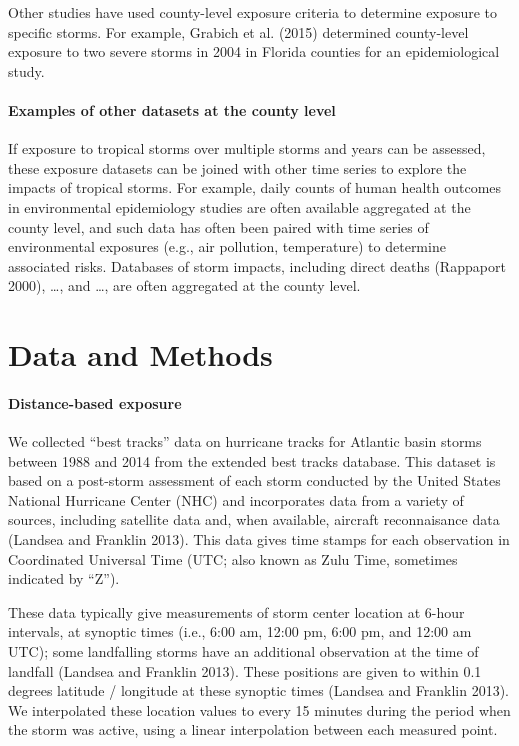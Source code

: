 \documentclass[]{elsarticle} %
\begin{document}
Other studies have used county-level exposure criteria to determine
exposure to specific storms. For example, Grabich et al. (2015)
determined county-level exposure to two severe storms in 2004 in Florida
counties for an epidemiological study.

\paragraph{Examples of other datasets at the county
level}\label{examples-of-other-datasets-at-the-county-level}

If exposure to tropical storms over multiple storms and years can be
assessed, these exposure datasets can be joined with other time series
to explore the impacts of tropical storms. For example, daily counts of
human health outcomes in environmental epidemiology studies are often
available aggregated at the county level, and such data has often been
paired with time series of environmental exposures (e.g., air pollution,
temperature) to determine associated risks. Databases of storm impacts,
including direct deaths (Rappaport 2000), \ldots{}, and \ldots{}, are
often aggregated at the county level.

\section{Data and Methods}\label{data-and-methods}

\paragraph{Distance-based exposure}\label{distance-based-exposure}

We collected ``best tracks'' data on hurricane tracks for Atlantic basin
storms between 1988 and 2014 from the extended best tracks database.
This dataset is based on a post-storm assessment of each storm conducted
by the United States National Hurricane Center (NHC) and incorporates
data from a variety of sources, including satellite data and, when
available, aircraft reconnaisance data (Landsea and Franklin 2013). This
data gives time stamps for each observation in Coordinated Universal
Time (UTC; also known as Zulu Time, sometimes indicated by ``Z'').

These data typically give measurements of storm center location at
6-hour intervals, at synoptic times (i.e., 6:00 am, 12:00 pm, 6:00 pm,
and 12:00 am UTC); some landfalling storms have an additional
observation at the time of landfall (Landsea and Franklin 2013). These
positions are given to within 0.1 degrees latitude / longitude at these
synoptic times (Landsea and Franklin 2013). We interpolated these
location values to every 15 minutes during the period when the storm was
active, using a linear interpolation between each measured point.
\end{document}
